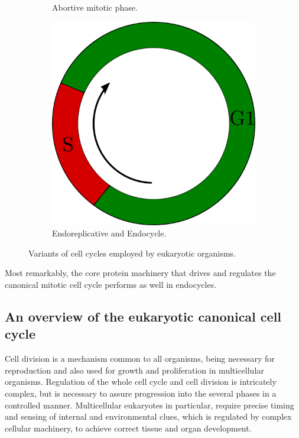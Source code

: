 \documentclass[11pt,twoside,a4paper]{report}
\begin{document}
\begin{figure}[here]
\begin{subfigure}{.33\textwidth}
				\caption{Abortive mitotic phase.}
			\end{subfigure}%
			\begin{subfigure}{.33\textwidth}
				\centering
				\includegraphics[width=0.95\linewidth]{pngs/endocycle.png}
				\caption{Endoreplicative and Endocycle.}
			\end{subfigure}%
			\caption[Variants of cell cycles employed by eukaryotic organisms]
			{Variants of cell cycles employed by eukaryotic organisms.}
			\label{fig:simple_cell_cycle}
		\end{figure}
		
		
		Most remarkably, the core protein machinery that drives and regulates the canonical mitotic cell cycle performs as well in endocycles.
		
			\subsection{An overview of the eukaryotic canonical cell cycle}
			Cell division is a mechanism common to all organisms, being necessary for reproduction and also used for growth and proliferation in multicellular organisms. Regulation of the whole cell cycle and cell division is intricately complex, but is necessary to assure progression into the several phases in a controlled manner. Multicellular eukaryotes in particular, require precise timing and sensing of internal and environmental clues, which is regulated by complex cellular machinery, to achieve correct tissue and organ development.
			
\end{document}
